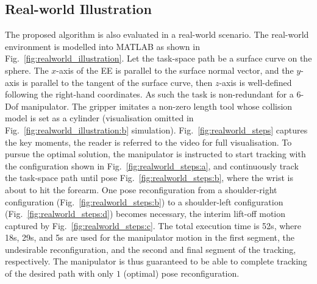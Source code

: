 \documentclass[letterpaper, 10 pt, conference]{ieeeconf}  %
\begin{document}
\subsection{Real-world Illustration}\label{section:realworld}
The proposed algorithm is also evaluated in a real-world scenario. 
The real-world environment is modelled into MATLAB as shown in Fig.~\ref{fig:realworld_illustration}. Let the task-space path be a surface curve on the sphere. 
The $x$-axis of the EE is parallel to the surface normal vector, and the $y$-axis is parallel to the tangent of the surface curve, then $z$-axis is well-defined following the right-hand coordinates. As such the task is non-redundant for a $6$-Dof manipulator. The gripper imitates a non-zero length tool whose collision model is set as a cylinder (visualisation omitted in Fig.~\ref{fig:realworld_illustration:b} simulation). 
Fig.~\ref{fig:realworld_steps} captures the key moments, the reader is referred to the video for full visualisation. 
To pursue the optimal solution, the manipulator is instructed %
to start tracking with the configuration shown in Fig.~\ref{fig:realworld_steps:a}, and continuously track the task-space path until pose Fig.~\ref{fig:realworld_steps:b}, where the wrist is about to hit the forearm. 
One pose reconfiguration from a shoulder-right configuration (Fig.~\ref{fig:realworld_steps:b}) to a shoulder-left configuration (Fig.~\ref{fig:realworld_steps:d}) becomes necessary, the interim lift-off motion captured by Fig.~\ref{fig:realworld_steps:c}. 
The total execution time is 52s, where 18s, 29s, and 5s are used for the manipulator motion in the first segment, the undesirable reconfiguration, and the second and final segment of the tracking, respectively. 
The manipulator is thus guaranteed to be able to complete tracking of the desired path with only $1$ (optimal) pose reconfiguration. 
\end{document}
